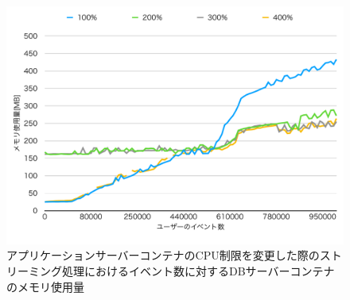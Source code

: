 \documentclass[../../../../../main]{subfiles}
\begin{document}
    \begin{figure}[H]
        \centering
        \includegraphics[width=12cm]{graph}
        \caption{アプリケーションサーバーコンテナのCPU制限を変更した際のストリーミング処理におけるイベント数に対するDBサーバーコンテナのメモリ使用量}
        \label{fig:stream-change-cpu-limit-db-memory-app_1024-db_1_1024}
    \end{figure}
\end{document}
